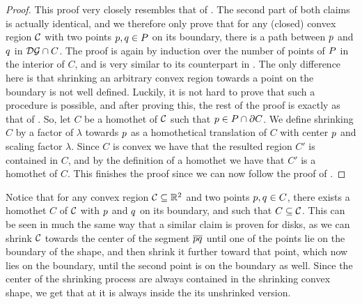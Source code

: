\documentclass[12pt]{article}%
\begin{document}
\begin{proof}
	This proof very closely resembles that of . The second part of both claims is actually identical, and we therefore only prove that  for any (closed) convex region $\mathcal{C}$ with two points $p,q\in P$ on its boundary, there is a path between $p$ and $q$ in $\mathcal{DG} \cap {C}$.
	The proof is again by induction over the number of points of $P$ in the interior of $C$, and is very similar to its counterpart in . The only difference here is that shrinking an arbitrary convex region towards a point on the boundary is not well defined.
	Luckily, it is not hard to prove that such a procedure is possible, and after proving this, the rest of the proof is exactly as that of .
	So, let  $C$ be a homothet of $\mathcal{C}$ such that $p\in P\cap\partial C$. We define shrinking $C$ by a factor of $\lambda$ towards $p$ as a homothetical translation of $C$ with center $p$ and scaling factor $\lambda$. Since $C$ is convex we have that the resulted region $C'$ is contained in $C$, and by the definition of a homothet we have that $C'$ is a homothet of $C$.
	This finishes the proof since we can now follow the proof of .

\end{proof}

Notice that for any convex region $\mathcal{C}\subseteq \mathbb{R}^2$ and two points $p,q \in C$, there exists a homothet $C$ of $\mathcal{C}$ with $p$ and $q$ on its boundary, and such that $C\subseteq \mathcal{C}$. This can be seen in much the same way that a similar claim is proven for disks, as we can shrink $\mathcal{C}$ towards the center of the segment $\overline{pq}$ until one of the points lie on the boundary of the shape, and then shrink it further toward that point, which now lies on the boundary, until the second point is on the boundary as well. Since the center of the shrinking process are always contained in the shrinking convex shape, we get that at it is always inside the its unshrinked version.
\end{document}
